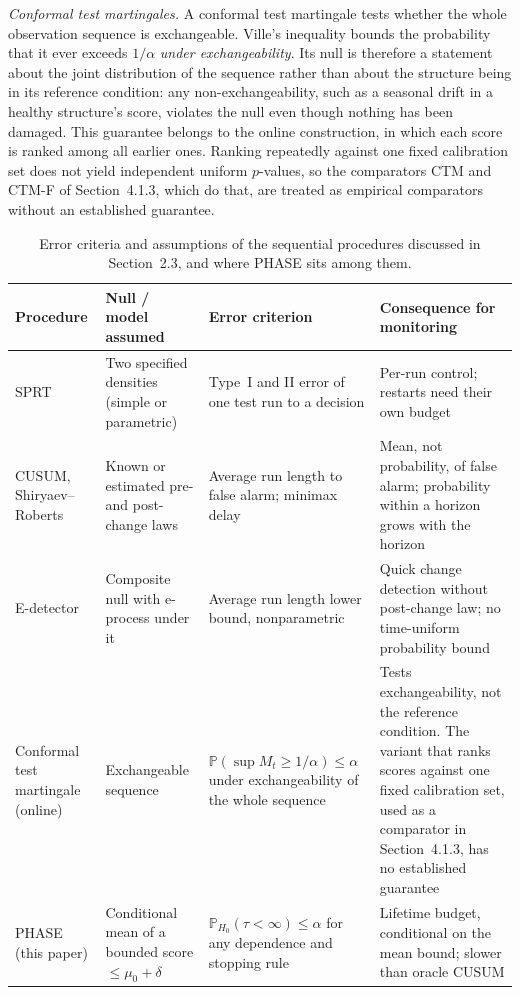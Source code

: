 \documentclass[12pt,a4paper]{article}
\newcommand{\rev}[1]{#1}
\newenvironment{revblock}{}{}
\newcommand{\rev}[1]{{\color{revcol}#1}}
\newenvironment{revblock}{\begingroup\color{revcol}}{\endgroup}
\newcommand{\rtwo}[1]{#1}
\newcommand{\rtwo}[1]{{\color{revcolb}#1}}
\newcommand{\Prob}{\mathbb{P}}
\begin{document}
\begin{revblock}
\noindent\emph{Conformal test martingales.} A conformal test martingale \citep{vovk2021testing} tests whether the whole observation sequence is exchangeable. Ville's inequality bounds the probability that it ever exceeds $1/\alpha$ \emph{under exchangeability}. Its null is therefore a statement about the joint distribution of the sequence rather than about the structure being in its reference condition: any non-exchangeability, such as a seasonal drift in a healthy structure's score, violates the null even though nothing has been damaged. \color{revcolb}\rev{This guarantee belongs to the online construction, in which each score is ranked among all earlier ones.\color{revcol} \color{revcolb}Ranking repeatedly against one fixed calibration set does not yield independent uniform $p$-values, so the comparators CTM and CTM-F of Section~4.1.3, which do that, are treated as empirical comparators without an established guarantee.}\color{revcol}
\end{revblock}

\begin{table}[t]
\centering
\small
\begin{revblock}
\caption{\rev{Error criteria and assumptions of the sequential procedures discussed in Section~2.3, and where PHASE sits among them.}}
\label{tab:criteria}
\begin{tabular}{p{2.7cm}p{3.6cm}p{3.7cm}p{4.4cm}}
\toprule
Procedure & Null / model assumed & Error criterion & Consequence for monitoring \\
\midrule
SPRT & Two specified densities (simple or parametric) & Type~I and II error of one test run to a decision & Per-run control; restarts need their own budget \\
CUSUM, Shiryaev--Roberts & Known or estimated pre- and post-change laws & Average run length to false alarm; minimax delay & Mean, not probability, of false alarm; probability within a horizon grows with the horizon \\
E-detector & Composite null with e-process under it & Average run length lower bound, nonparametric & Quick change detection without post-change law; no time-uniform probability bound \\
 \rtwo{Conformal test martingale (online)} & Exchangeable sequence & \rtwo{$\Prob(\sup M_t\ge1/\alpha)\le\alpha$ under exchangeability of the whole sequence} & \rtwo{\rev{Tests exchangeability, not the reference condition. The variant that ranks scores against one fixed calibration set, used as a comparator in Section~4.1.3, has no established guarantee}}  \\
PHASE (this paper) & Conditional mean of a bounded score $\le\mu_0+\delta$ & $\Prob_{H_0}(\tau<\infty)\le\alpha$ for any dependence and stopping rule & Lifetime budget, conditional on the mean bound; slower than oracle CUSUM \\
\bottomrule
\end{tabular}
\end{revblock}
\end{table}
\end{document}
